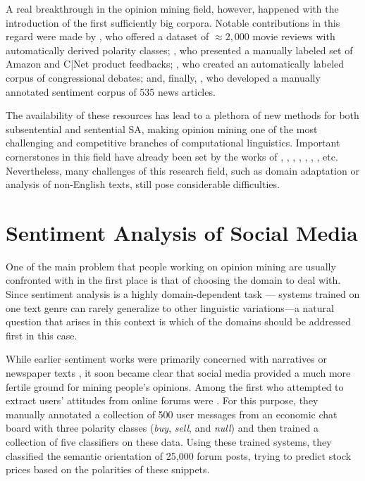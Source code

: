 A real breakthrough in the opinion mining field, however, happened
with the introduction of the first sufficiently big corpora.  Notable
contributions in this regard were made by \citet{Pang:04,Pang:05}, who
offered a dataset of $\approx2,000$ movie reviews with automatically
derived polarity classes; \citet{Hu:04}, who presented a manually
labeled set of Amazon and C|Net product feedbacks; \citet{Thomas:06},
who created an automatically labeled corpus of congressional debates;
and, finally, \citet{Wiebe:05}, who developed a manually annotated
sentiment corpus of 535 news articles.

The availability of these resources has lead to a plethora of new
methods for both subsentential and sentential SA, making opinion
mining one of the most challenging and competitive branches of
computational linguistics.  Important cornerstones in this field have
already been set by the works of \citet{Pang:02}, \citet{Wiebe:05},
\citet{Wilson:05}, \citet{Breck:07}, \citet{Choi:09,Choi:10},
\citet{Yessenalina:11}, \citet{Socher:11, Socher:12}, etc.
Nevertheless, many challenges of this research field, such as domain
adaptation or analysis of non-English texts, still pose considerable
difficulties.

\section{Sentiment Analysis of Social Media}

One of the main problem that people working on opinion mining are
usually confronted with in the first place is that of choosing the
domain to deal with. Since sentiment analysis is a highly
domain-dependent task \citep[see][]{Aue:05,Blitzer:07,Li:08}---\ie{}
systems trained on one text genre can rarely generalize to other
linguistic variations---a natural question that arises in this context
is which of the domains should be addressed first in this case.

While earlier sentiment works were primarily concerned with narratives
\citep{Wiebe:90a,Wiebe:94} or newspaper texts
\citep{Wiebe:03,Wiebe:05,Bautin:08}, it soon became clear that social
media provided a much more fertile ground for mining people's
opinions.  Among the first who attempted to extract users' attitudes
from online forums were \citet{Das:01}. For this purpose, they
manually annotated a collection of 500 user messages from an economic
chat board with three polarity classes (\emph{buy}, \emph{sell}, and
\emph{null}) and then trained a collection of five classifiers on
these data.  Using these trained systems, they classified the semantic
orientation of 25,000 forum posts, trying to predict stock prices
based on the polarities of these snippets.

